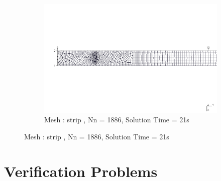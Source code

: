 \documentclass[9pt]{beamer}
\begin{document}
\begin{frame}
\begin{figure}[h!]
\begin{subfigure}{1\textwidth}

\includegraphics[width=\linewidth,trim={0cm 9cm 0cm 9cm},clip]{ParaStudy_onlydata/Mesh_Dependency/meshes/strip.png}
\caption{Mesh : strip , Nn = 1886, Solution Time = 21s }

\end{subfigure} 


\end{figure}
\end{frame}


\section{Verification Problems}
\end{document}
